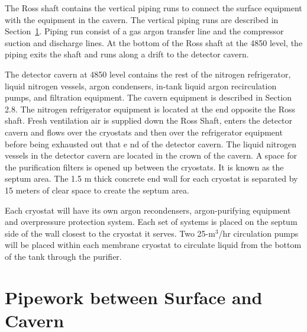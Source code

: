 The Ross shaft contains the vertical piping runs to connect the surface equipment with the
equipment in the cavern. The vertical piping runs are described
in Section~\ref{sec:cryo-cryosys-pipework-surface-cav}. 
Piping run consist of a
gas argon transfer line and the compressor suction and discharge lines. At the
bottom of the Ross shaft at the 4850 level, the piping exits the shaft and runs along a drift to
the detector cavern.

The detector cavern at 4850 level
contains the rest of the nitrogen refrigerator, liquid nitrogen
vessels, argon condensers, in-tank liquid argon recirculation pumps, and filtration equipment.
The cavern equipment is described in Section 2.8. The nitrogen
refrigerator equipment is
located at the end opposite the Ross shaft. Fresh ventilation air is supplied down the Ross
Shaft, enters the detector cavern and flows over the cryostats and then over the refrigerator
equipment before being exhausted out that e
nd of the detector cavern. The liquid nitrogen
vessels in the detector cavern are located in the crown of the cavern. A space for the
purification filters is opened up between the cryostats. It is known as the septum area. The 1.5
m thick concrete end
wall for each cryostat is separated by 15 meters of clear space to create
the septum area.

Each cryostat will have its own argon recondensers, argon-purifying equipment and
overpressure protection system.
Each set of systems is
placed on the septum side of the wall
closest to the cryostat it serves. Two 25-m$^3$/hr circulation pumps will be placed within each
membrane cryostat to circulate liquid from the bottom of the tank through the purifier.


\section{Pipework between Surface and Cavern}
\label{sec:cryo-cryosys-pipework-surface-cav}

